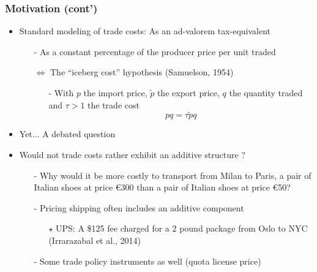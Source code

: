 \documentclass[10 pt,Helvetica, french]{beamer}
\begin{document}
\begin{frame}
\frametitle{Motivation (cont')}
\begin{itemize}
\item Standard modeling of trade costs: As an ad-valorem tax-equivalent \vspace{0.1cm}
\begin{itemize}
\item[-] As a constant percentage of the producer price per unit traded \vspace{0.1cm}
\item[$\Leftrightarrow$] The ``iceberg cost'' hypothesis (Samuelson, 1954) \vspace{0.1cm}
\begin{itemize}
\item[-] With $p$ the import price, $\widetilde{p}$ the export price, $q$ the quantity traded and $\tau >1$ the trade cost \vspace{0.1cm}
\footnotesize
$$pq = \tau \widetilde{p}q$$
\normalsize
\end{itemize}
\end{itemize}
\item Yet... A debated question \vspace{0.1cm}
\item Would not trade costs rather exhibit an additive structure ?  \vspace{0.1cm} \vspace{0.1cm}
\begin{itemize}
\item[-] Why would it be more costly to transport from Milan to Paris, a pair of Italian shoes at price \euro 300 than a pair of Italian shoes at price \euro 50? \vspace{0.1cm}
\item[-] Pricing shipping often includes an additive component \vspace{0.1cm}
\begin{itemize}
\item[$\star$] UPS: A \$125 fee charged for a 2 pound package from Oslo to NYC (Irrarazabal et al., 2014) \vspace{0.1cm}
\end{itemize}
\item[-] Some trade policy instruments as well (quota license price)
\end{itemize}
\end{itemize}
\end{frame}
\end{document}
